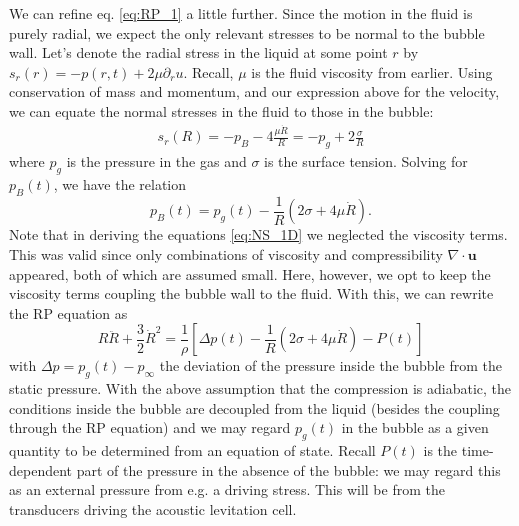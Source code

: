 \documentclass[rmp,aps,nofootinbib,superscriptaddress,floatfix,10pt]{revtex4-2}
\begin{document}
We can refine eq. \ref{eq:RP_1} a little further. Since the motion in the fluid is purely radial, we expect the only relevant stresses to be normal to the bubble wall. Let's denote the radial stress in the liquid at some point $r$ by $s_r(r)=-p(r,t)+2\mu \partial_r u$. Recall, $\mu$ is the fluid viscosity from earlier. Using conservation of mass and momentum, and our expression above for the velocity, we can equate the normal stresses in the fluid to those in the bubble:
\begin{equation}
\begin{split}
    s_r(R)=-p_B-4\frac{\mu \dot{R}}{R}=-p_g+2\frac{\sigma}{R}
\end{split}
\end{equation}
where $p_g$ is the pressure in the gas and $\sigma$ is the surface tension. Solving for $p_B(t)$, we have the relation \cite{brenner2002single,prosperetti1999old,prosperetti1986bubble}
\begin{equation}
    p_B(t)=p_g(t)-\frac{1}{R}\left( 2\sigma+4\mu \dot{R} \right)
    \label{eq:p_B}.
\end{equation}
Note that in deriving the equations \ref{eq:NS_1D} we neglected the viscosity terms. This was valid since only combinations of viscosity and compressibility $\nabla \cdot \bm{u}$ appeared, both of which are assumed small. Here, however, we opt to keep the viscosity terms coupling the bubble wall to the fluid. With this, we can rewrite the RP equation as 
\begin{equation}
    R\ddot{R}+\frac{3}{2}\dot{R}^2 = \frac{1}{\rho} \left[ \Delta p(t)-\frac{1}{R}\left( 2\sigma+4\mu \dot{R} \right)-P(t) \right]
    \label{eq:RP_2}
\end{equation}
with $\Delta p = p_g(t)-p_\infty$ the deviation of the pressure inside the bubble from the static pressure. With the above assumption that the compression is adiabatic, the conditions inside the bubble are decoupled from the liquid (besides the coupling through the RP equation) and we may regard $p_g(t)$ in the bubble as a given quantity to be determined from an equation of state. Recall $P(t)$ is the time-dependent part of the pressure in the absence of the bubble: we may regard this as an external pressure from e.g. a driving stress. This will be from the transducers driving the acoustic levitation cell.
\end{document}
